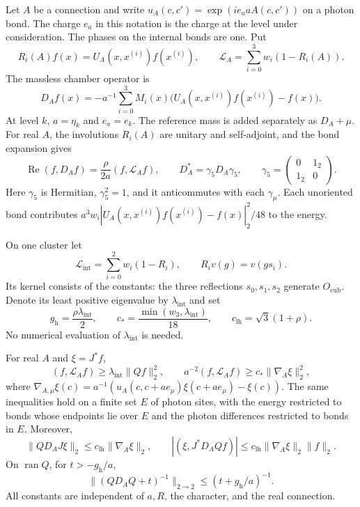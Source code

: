 Let $A$ be a connection and write
$u_A(c,c')=\exp(ie_a aA(c,c'))$ on a photon bond. The charge $e_a$ in
this notation is the charge at the level under consideration. The
phases on the internal bonds are one. Put
\[
 R_i(A)f(x)=U_A(x,x^{(i)})f(x^{(i)}),\qquad
 \mathcal L_A=\sum_{i=0}^3w_i(1-R_i(A)).
\]
The massless chamber operator is
\begin{equation}\label{eq:propagator-dirac}
 D_Af(x)=-a^{-1}\sum_{i=0}^3M_i(x)
       \big(U_A(x,x^{(i)})f(x^{(i)})-f(x)\big).
\end{equation}
At level $k$, $a=\eta_k$ and $e_a=e_k$. The reference mass is
added separately as $D_A+\mu$.
For real $A$, the involutions $R_i(A)$ are unitary and self-adjoint,
and the bond expansion gives
\begin{equation}\label{eq:dirac-realpart}
 \operatorname{Re}(f,D_Af)=\frac{\rho}{2a}(f,\mathcal L_Af),
 \qquad D_A^*=\gamma_5D_A\gamma_5,
 \qquad \gamma_5=\begin{pmatrix}0&1_2\\1_2&0\end{pmatrix}.
\end{equation}
Here $\gamma_5$ is Hermitian, $\gamma_5^2=1$, and it anticommutes with
each $\gamma_\mu$. Each unoriented bond contributes
$a^3w_i|U_A(x,x^{(i)})f(x^{(i)})-f(x)|_2^2/48$ to the energy.

On one cluster let
\[
 \mathcal L_{\mathrm{int}}=\sum_{i=0}^2w_i(1-R_i),
 \qquad R_iv(g)=v(gs_i).
\]
Its kernel consists of the constants: the three reflections
$s_0,s_1,s_2$ generate $O_{\mathrm{cub}}$. Denote its least positive
eigenvalue by $\lambda_{\mathrm{int}}$ and set
\[
 g_{\mathrm h}=\frac{\rho\lambda_{\mathrm{int}}}{2},\qquad
 c_* =\frac{\min(w_3,\lambda_{\mathrm{int}})}{18},\qquad
 c_{\mathrm{lh}}=\sqrt3(1+\rho).
\]
No numerical evaluation of $\lambda_{\mathrm{int}}$ is needed.

\begin{proposition}\label{prop:cluster-energy}
For real $A$ and $\xi=J^*f$,
\begin{equation}\label{eq:cluster-energy}
 (f,\mathcal L_Af)\ge\lambda_{\mathrm{int}}\|Qf\|_2^2,
 \qquad
 a^{-2}(f,\mathcal L_Af)\ge c_*\|\nabla_A\xi\|_2^2,
\end{equation}
where
$\nabla_{A,\mu}\xi(c)=a^{-1}(u_A(c,c+ae_\mu)\xi(c+ae_\mu)-\xi(c))$.
The same inequalities hold on a finite set $E$ of photon sites, with the
energy restricted to bonds whose endpoints lie over $E$ and the photon
differences restricted to bonds in $E$. Moreover,
\begin{equation}\label{eq:offdiagonal-bound}
 \|QD_AJ\xi\|_2\le c_{\mathrm{lh}}\|\nabla_A\xi\|_2,
 \qquad
 |(\xi,J^*D_AQf)|\le
 c_{\mathrm{lh}}\|\nabla_A\xi\|_2\|f\|_2.
\end{equation}
On $\operatorname{ran}Q$, for $t>-g_{\mathrm h}/a$,
\begin{equation}\label{eq:heavy-inverse}
 \|(QD_AQ+t)^{-1}\|_{2\to2}\le(t+g_{\mathrm h}/a)^{-1}.
\end{equation}
All constants are independent of $a,R$, the character, and the real
connection.
\end{proposition}

